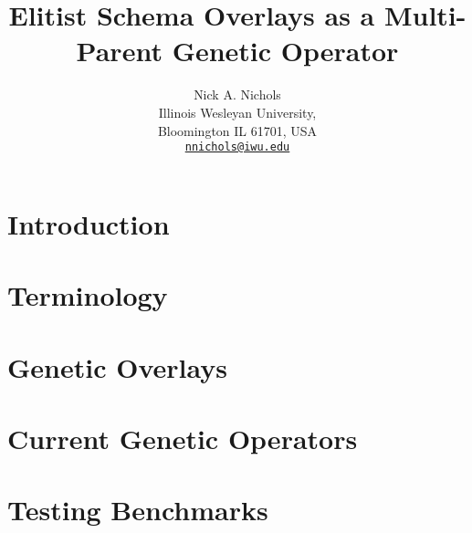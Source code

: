 \documentclass{article}
\makeatletter
\def \papertitle {Elitist Schema Overlays as a Multi-Parent Genetic Operator}
\def \paperauthors {Nick A. Nichols}
\def \paperinstitute {\small Illinois Wesleyan University, \\ \small Bloomington IL 61701, USA}
\def \paperemails {\small\href{mailto:nnichols@iwu.edu}{\nolinkurl{nnichols@iwu.edu}}}
\makeatother
\begin{document}
\title{\papertitle}
\author{\paperauthors \\ \paperinstitute \\ \paperemails}

\maketitle


\begin{abstract}

\end{abstract}








\section{Introduction} 
\label{sec:introduction}



\section{Terminology} 
\label{sec:terminology}



\section{Genetic Overlays}
\label{sec:overlays}



\section{Current Genetic Operators}
\label{sec:current}



\section{Testing Benchmarks}
\label{sec:testfunctions}

\end{document}

